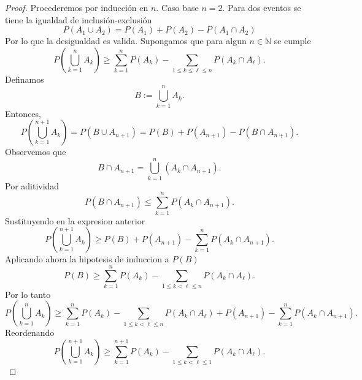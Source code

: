 \documentclass[12pt,a4paper]{article}
\newcommand{\paren}[1]{\left( #1 \right)}
\begin{document}
    \begin{proof}
        Procederemos por inducción en $n$. Caso base $n=2$. Para dos eventos se tiene
        la igualdad de inclusión-exclusión
        \begin{equation*}
            P(A_{1}\cup A_{2})=P(A_{1})+P(A_{2})-P(A_{1}\cap A_{2})
        \end{equation*}
        Por lo que la desigualdad es valida. Supongamos que para algun $n\in\mathbb{N}$
        se cumple
        \begin{equation*}
            P\paren{\bigcup_{k=1}^{n}A_{k}}\geq\sum_{k=1}^{n}P(A_{k})-\sum_{1\leq k\leq\ell\leq n}P(A_{k}\cap A_{\ell}).
        \end{equation*}
        Definamos
        \begin{equation*}
            B:=\bigcup_{k=1}^{n}A_{k}.
        \end{equation*}
        Entonces,
        \begin{equation*}
            P\paren{\bigcup_{k=1}^{n+1}A_{k}}=P(B\cup A_{n+1})=P(B)+P(A_{n+1})-P(B\cap A_{n+1}).
        \end{equation*}
        Observemos que
        \begin{equation*}
            B\cap A_{n+1}=\bigcup_{k=1}^{n}(A_{k}\cap A_{n+1}).
        \end{equation*}
        Por aditividad
        \begin{equation*}
            P(B\cap A_{n+1})\leq\sum_{k=1}^{n}P(A_{k}\cap A_{n+1}).
        \end{equation*}
        Sustituyendo en la expresion anterior 
        \begin{equation*}
            P\paren{\bigcup_{k=1}^{n+1}A_{k}}\geq P(B)+P(A_{n+1})-\sum_{k=1}^{n}P(A_{k}\cap A_{n+1}).
        \end{equation*}
        Aplicando ahora la hipotesis de induccion a $P(B)$
        \begin{equation*}
            P(B)\geq\sum_{k=1}^{n}P(A_{k})-\sum_{1\leq k\lt\ell\leq n}P(A_{k}\cap A_{\ell}).
        \end{equation*}
        Por lo tanto
        \begin{equation*}
            P\paren{\bigcup_{k=1}^{n}A_{k}}\geq\sum_{k=1}^{n}P(A_{k})-\sum_{1\leq k\lt\ell\leq n}P(A_{k}\cap A_{\ell})
            +P(A_{n+1})-\sum_{k=1}^{n}P(A_{k}\cap A_{n+1}).
        \end{equation*}
        Reordenando
        \begin{equation*}
            P\paren{\bigcup_{k=1}^{n+1}A_{k}}\geq\sum_{k=1}^{n+1}P(A_{k})-\sum_{1\leq k\lt\ell\leq1}P(A_{k}\cap A_{\ell}).
        \end{equation*}
    \end{proof}
\end{document}
